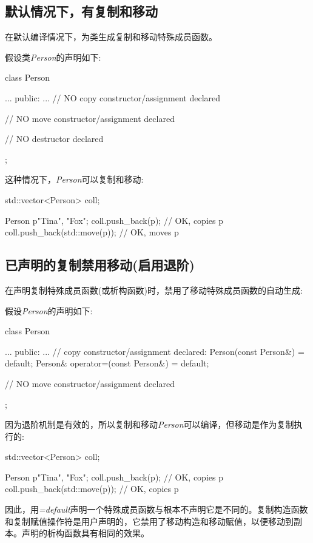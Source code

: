 \subsection{默认情况下，有复制和移动}

在默认编译情况下，为类生成复制和移动特殊成员函数。

假设类\textit{Person}的声明如下:

\begin{cppcode}
class Person {
	...
public:
	...
	// NO copy constructor/assignment declared
	
	// NO move constructor/assignment declared
	
	// NO destructor declared
};
\end{cppcode}

这种情况下，\textit{Person}可以复制和移动:

\begin{cppcode}
std::vector<Person> coll;

Person p{"Tina", "Fox"};
coll.push_back(p); // OK, copies p
coll.push_back(std::move(p)); // OK, moves p
\end{cppcode}

\subsection{已声明的复制禁用移动(启用退阶)}

在声明复制特殊成员函数(或析构函数)时，禁用了移动特殊成员函数的自动生成:

假设\textit{Person}的声明如下:

\begin{cppcode}
class Person {
	...
public:
	...
	// copy constructor/assignment declared:
	Person(const Person&) = default;
	Person& operator=(const Person&) = default;
	
	// NO move constructor/assignment declared
};
\end{cppcode}

因为退阶机制是有效的，所以复制和移动\textit{Person}可以编译，但移动是作为复制执行的:

\begin{cppcode}
std::vector<Person> coll;

Person p{"Tina", "Fox"};
coll.push_back(p); // OK, copies p
coll.push_back(std::move(p)); // OK, copies p
\end{cppcode}

因此，用\textit{=default}声明一个特殊成员函数与根本不声明它是不同的。复制构造函数和复制赋值操作符是用户声明的，它禁用了移动构造和移动赋值，以便移动到副本。声明的析构函数具有相同的效果。

